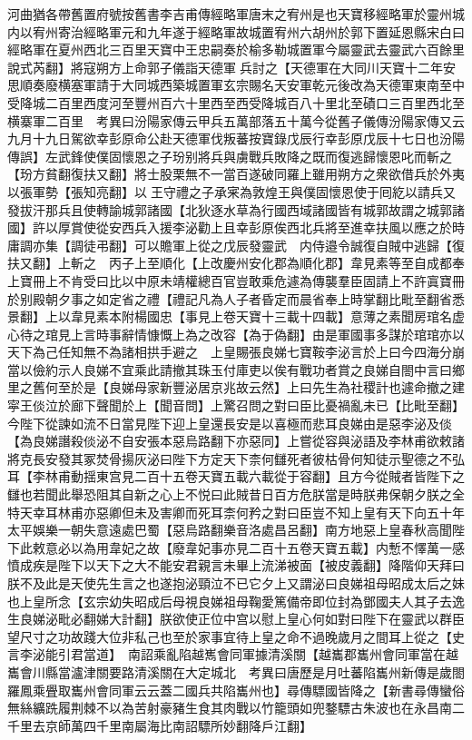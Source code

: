 河曲猶各帶舊置府號按舊書李吉甫傳經略軍唐末之宥州是也天寶移經略軍於靈州城内以宥州寄治經略軍元和九年遂于經略軍故城置宥州六胡州於郭下置延恩縣宋白曰經略軍在夏州西北三百里天寶中王忠嗣奏於榆多勒城置軍今屬靈武去靈武六百餘里說式芮翻】將寇朔方上命郭子儀詣天德軍兵討之【天德軍在大同川天寶十二年安思順奏廢横塞軍請于大同城西築城置軍玄宗賜名天安軍乾元後改為天德軍東南至中受降城二百里西度河至豐州百六十里西至西受降城百八十里北至磧口三百里西北至横寨軍二百里　考異曰汾陽家傳云甲兵五萬部落五十萬今從舊子儀傳汾陽家傳又云九月十九日駕欲幸彭原命公赴天德軍伐叛蕃按寶錄戊辰行幸彭原戊辰十七日也汾陽傳誤】左武鋒使僕固懷恩之子玢别將兵與虜戰兵敗降之既而復逃歸懷恩叱而斬之【玢方貧翻復扶又翻】將士股栗無不一當百遂破同羅上雖用朔方之衆欲借兵於外夷以張軍勢【張知亮翻】以王守禮之子承宷為敦煌王與僕固懷恩使于囘紇以請兵又發拔汗那兵且使轉諭城郭諸國【北狄逐水草為行國西域諸國皆有城郭故謂之城郭諸國】許以厚賞使從安西兵入援李泌勸上且幸彭原俟西北兵將至進幸扶風以應之於時庸調亦集【調徒弔翻】可以贍軍上從之戊辰發靈武　内侍邉令誠復自賊中逃歸【復扶又翻】上斬之　丙子上至順化【上改慶州安化郡為順化郡】韋見素等至自成都奉上寶冊上不肯受曰比以中原未靖權總百官豈敢乘危遽為傳襲羣臣固請上不許寘寶冊於别殿朝夕事之如定省之禮【禮記凡為人子者昏定而晨省奉上時掌翻比毗至翻省悉景翻】上以韋見素本附楊國忠【事見上卷天寶十三載十四載】意薄之素聞房琯名虚心待之琯見上言時事辭情慷慨上為之改容【為于偽翻】由是軍國事多謀於琯琯亦以天下為己任知無不為諸相拱手避之　上皇賜張良娣七寶鞍李泌言於上曰今四海分崩當以儉約示人良娣不宜乘此請撤其珠玉付庫吏以俟有戰功者賞之良娣自閤中言曰鄉里之舊何至於是【良娣母家新豐泌居京兆故云然】上曰先生為社稷計也遽命撤之建寜王倓泣於廊下聲聞於上【聞音問】上驚召問之對曰臣比憂禍亂未已【比毗至翻】今陛下從諫如流不日當見陛下迎上皇還長安是以喜極而悲耳良娣由是惡李泌及倓【為良娣譖殺倓泌不自安張本惡烏路翻下亦惡同】上嘗從容與泌語及李林甫欲敕諸將克長安發其冢焚骨揚灰泌曰陛下方定天下柰何讎死者彼枯骨何知徒示聖德之不弘耳【李林甫動揺東宫見二百十五卷天寶五載六載從于容翻】且方今從賊者皆陛下之讎也若聞此舉恐阻其自新之心上不悦曰此賊昔日百方危朕當是時朕弗保朝夕朕之全特天幸耳林甫亦惡卿但未及害卿而死耳柰何矜之對曰臣豈不知上皇有天下向五十年太平娛樂一朝失意遠處巴蜀【惡烏路翻樂音洛處昌呂翻】南方地惡上皇春秋高聞陛下此敕意必以為用韋妃之故【廢韋妃事亦見二百十五卷天寶五載】内慙不懌萬一感憤成疾是陛下以天下之大不能安君親言未畢上流涕被面【被皮義翻】降階仰天拜曰朕不及此是天使先生言之也遂抱泌頸泣不已它夕上又謂泌曰良娣祖母昭成太后之妹也上皇所念【玄宗幼失昭成后母視良娣祖母鞠愛篤備帝即位封為鄧國夫人其子去逸生良娣泌毗必翻娣大計翻】朕欲使正位中宫以慰上皇心何如對曰陛下在靈武以群臣望尺寸之功故踐大位非私己也至於家事宜待上皇之命不過晚歲月之間耳上從之【史言李泌能引君當道】　南詔乘亂陷越嶲會同軍據清溪關【越巂郡巂州會同軍當在越巂會川縣當瀘津關要路清溪關在大定城北　考異曰唐歷是月吐蕃陷巂州新傳是歲閤羅鳳乘舋取巂州會同軍云云蓋二國兵共陷巂州也】尋傳驃國皆降之【新書尋傳蠻俗無絲纊跣履荆棘不以為苦射豪豬生食其肉戰以竹籠頭如兜鍪驃古朱波也在永昌南二千里去京師萬四千里南屬海比南詔驃所妙翻降戶江翻】

